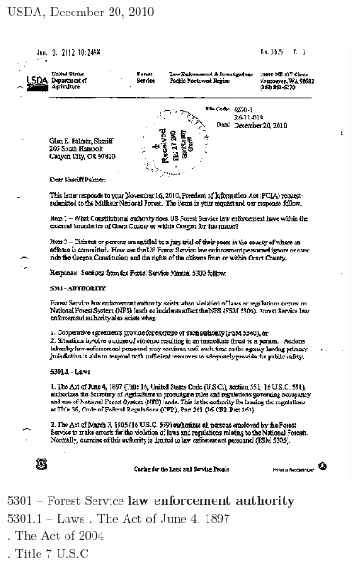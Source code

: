 \begin{frame}{USDA, December 20, 2010}
    \begin{columns}[onlytextwidth]
            \centering
            \includegraphics[width=0.75\textwidth]{img/usda-letter.png} \\

            5301 -- Forest Service \textbf{law enforcement authority} \\
            5301.1 -- Laws
            . The Act of June 4, 1897 \\
            . The Act of 2004 \\
            . Title 7 U.S.C \\
    \end{columns}
\end{frame}

